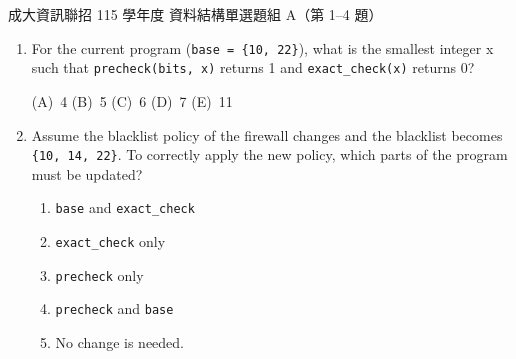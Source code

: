 \begin{pastexam}[label={px:ncku-115-prog-04}]{成大資訊聯招 115 學年度 資料結構單選題組 A（第 1--4 題）}
\begin{enumerate}
\item[3.] [3\%] For the current program (\texttt{base = \{10, 22\}}), what is the smallest integer x such
that \texttt{precheck(bits, x)} returns 1 and \texttt{exact\_check(x)} returns 0?

(A)~4 \qquad (B)~5 \qquad (C)~6 \qquad (D)~7 \qquad (E)~11

\item[4.] [3\%] Assume the blacklist policy of the firewall changes and the blacklist becomes
\texttt{\{10, 14, 22\}}. To correctly apply the new policy, which parts of the program must be updated?
\begin{enumerate}[label=(\Alph*),nosep]
\item \texttt{base} and \texttt{exact\_check}
\item \texttt{exact\_check} only
\item \texttt{precheck} only
\item \texttt{precheck} and \texttt{base}
\item No change is needed.
\end{enumerate}
\end{enumerate}
\end{pastexam}

